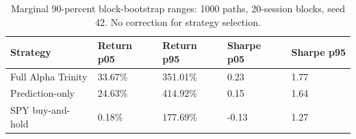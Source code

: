 \begin{table}[htbp]
\caption{Marginal 90-percent block-bootstrap ranges: 1000 paths, 20-session blocks, seed 42. No correction for strategy selection.}
\label{tab:bootstrap}
\begin{tabular}{lllll}
\toprule
Strategy & Return p05 & Return p95 & Sharpe p05 & Sharpe p95 \\
\midrule
Full Alpha Trinity & 33.67\% & 351.01\% & 0.23 & 1.77 \\
Prediction-only & 24.63\% & 414.92\% & 0.15 & 1.64 \\
SPY buy-and-hold & 0.18\% & 177.69\% & -0.13 & 1.27 \\
\bottomrule
\end{tabular}
\end{table}
